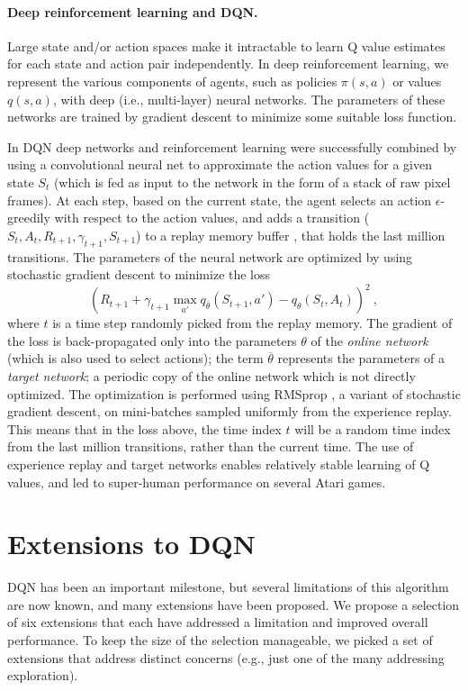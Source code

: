 \documentclass[letterpaper]{article} %
\begin{document}
\paragraph{Deep reinforcement learning and DQN.}
Large state and/or action spaces make it intractable to learn Q value estimates for each state and action pair independently. 
In deep reinforcement learning, we represent the various components of agents, such as policies $\pi(s,a)$ or values $q(s,a)$, with deep (i.e., multi-layer) neural networks. The parameters of these networks are trained by gradient descent to minimize some suitable loss function.

In DQN \cite{Mnih2015} deep networks and reinforcement learning were successfully combined by using a convolutional neural net to approximate the action values for a given state $S_t$ (which is fed as input to the network in the form of a stack of raw pixel frames). At each step, based on the current state, the agent selects an action $\epsilon$-greedily with respect to the action values, and adds a transition ($S_t, A_t, R_{t+1}, \gamma_{t+1}, S_{t+1}$) to a replay memory buffer \cite{Lin1992}, that holds the last million transitions.  The parameters of the neural network are optimized by using stochastic gradient descent to minimize the loss
%
\begin{equation} \label{Qlearning}
(R_{t+1} + \gamma_{t+1} \max_{a'} q_{\overline{\theta}}(S_{t+1}, a') - q_\theta(S_t, A_t))^2 \ ,
\end{equation}
%
where $t$ is a time step randomly picked from the replay memory.
The gradient of the loss is back-propagated only into the parameters $\theta$ of the \textit{online network} (which is also used to select actions); the term $\overline{\theta}$ represents the parameters of a \textit{target network}; a periodic copy of the online network which is not directly optimized. The optimization is performed using RMSprop \cite{tieleman2012lecture}, a variant of stochastic gradient descent, on mini-batches sampled uniformly from the experience replay. This means that in the loss above, the time index $t$ will be a random time index from the last million transitions, rather than the current time. The use of experience replay and target networks enables relatively stable learning of Q values, and led to super-human performance on several Atari games.

\section{Extensions to DQN}
DQN has been an important milestone, but several limitations of this algorithm are now known, and many extensions have been proposed.
We propose a selection of six extensions that each have addressed a limitation and improved overall performance. 
To keep the size of the selection manageable, we picked a set of extensions that address distinct concerns (e.g., just one of the many addressing exploration).
\end{document}
